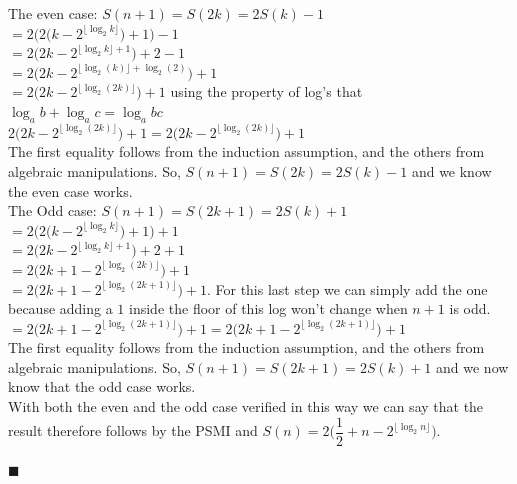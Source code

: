 \documentclass[10pt, AMS Euler]{article}
\begin{document}
    \noindent The even case: $S(n+1)=S(2k)=2S(k)-1$\\
    $=2\big(2\big(k-2^{\lfloor \log_2k\rfloor}\big)+1\big)-1$\\
    $=2\big(2k-2^{\lfloor \log_2k\rfloor+1}\big)+2-1$\\
    $=2\big(2k-2^{\lfloor \log_2(k)\rfloor+\log_2(2)}\big)+1$\\
    $=2\big(2k-2^{\lfloor \log_2(2k)\rfloor}\big)+1$ using the property of log's that $\log_ab+\log_ac=\log_abc$\\
    $2\big(2k-2^{\lfloor \log_2(2k)\rfloor}\big)+1=2\big(2k-2^{\lfloor \log_2(2k)\rfloor}\big)+1$\\
    The first equality follows from the induction assumption, and the others from algebraic manipulations. So, $S(n+1)=S(2k)=2S(k)-1$ and we know the even case works.\\

    \noindent The Odd case: $S(n+1)=S(2k+1)=2S(k)+1$\\
    $=2\big(2\big(k-2^{\lfloor \log_2k\rfloor}\big)+1\big)+1$\\
    $=2\big(2k-2^{\lfloor \log_2k\rfloor+1}\big)+2+1$\\
    $=2\big(2k+1-2^{\lfloor \log_2(2k)\rfloor}\big)+1$\\
    $=2\big(2k+1-2^{\lfloor \log_2(2k+1)\rfloor}\big)+1$. For this last step we can simply add the one because adding a $1$ inside the floor of this log won't change when $n+1$ is odd.\\
    $=2\big(2k+1-2^{\lfloor \log_2(2k+1)\rfloor}\big)+1=2\big(2k+1-2^{\lfloor \log_2(2k+1)\rfloor}\big)+1$\\
    The first equality follows from the induction assumption, and the others from algebraic manipulations. So, $S(n+1)=S(2k+1)=2S(k)+1$ and we now know that the odd case works.\\

    \noindent With both the even and the odd case verified in this way we can say that the result therefore follows by the PSMI and $\boxed{S(n)=2\big(\dfrac{1}{2}+n-2^{\lfloor \log_2n\rfloor}\big)}.$
    
    \hfill $\blacksquare$
	
	\vspace{1em}
	
	\noindent \underline{\hspace{5in}}
	
	
	
\end{document}
